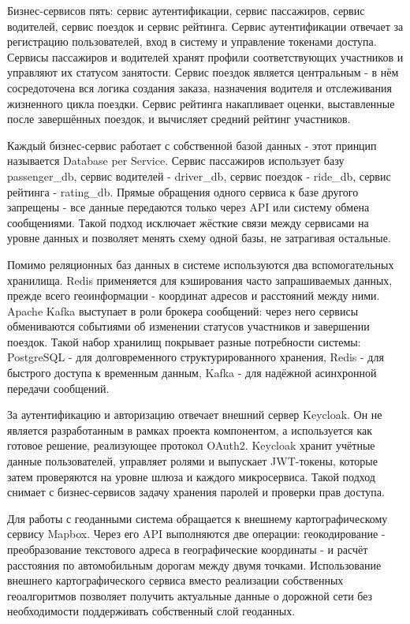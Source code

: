 {	\par \redline Бизнес-сервисов пять: сервис аутентификации, сервис пассажиров, сервис водителей, сервис поездок и сервис рейтинга. Сервис аутентификации отвечает за регистрацию пользователей, вход в систему и управление токенами доступа. Сервисы пассажиров и водителей хранят профили соответствующих участников и управляют их статусом занятости. Сервис поездок является центральным - в нём сосредоточена вся логика создания заказа, назначения водителя и отслеживания жизненного цикла поездки. Сервис рейтинга накапливает оценки, выставленные после завершённых поездок, и вычисляет средний рейтинг участников.
	
	\par \redline Каждый бизнес-сервис работает с собственной базой данных - этот принцип называется Database per Service. Сервис пассажиров использует базу passenger\_db, сервис водителей - driver\_db, сервис поездок - ride\_db, сервис рейтинга - rating\_db. Прямые обращения одного сервиса к базе другого запрещены - все данные передаются только через API или систему обмена сообщениями. Такой подход исключает жёсткие связи между сервисами на уровне данных и позволяет менять схему одной базы, не затрагивая остальные.
	
	\par \redline Помимо реляционных баз данных в системе используются два вспомогательных хранилища. Redis применяется для кэширования часто запрашиваемых данных, прежде всего геоинформации - координат адресов и расстояний между ними. Apache Kafka выступает в роли брокера сообщений: через него сервисы обмениваются событиями об изменении статусов участников и завершении поездок. Такой набор хранилищ покрывает разные потребности системы: PostgreSQL - для долговременного структурированного хранения, Redis - для быстрого доступа к временным данным, Kafka - для надёжной асинхронной передачи сообщений.
	
	\par \redline За аутентификацию и авторизацию отвечает внешний сервер Keycloak. Он не является разработанным в рамках проекта компонентом, а используется как готовое решение, реализующее протокол OAuth2. Keycloak хранит учётные данные пользователей, управляет ролями и выпускает JWT-токены, которые затем проверяются на уровне шлюза и каждого микросервиса. Такой подход снимает с бизнес-сервисов задачу хранения паролей и проверки прав доступа.
	
	\par \redline Для работы с геоданными система обращается к внешнему картографическому сервису Mapbox. Через его API выполняются две операции: геокодирование - преобразование текстового адреса в географические координаты - и расчёт расстояния по автомобильным дорогам между двумя точками. Использование внешнего картографического сервиса вместо реализации собственных геоалгоритмов позволяет получить актуальные данные о дорожной сети без необходимости поддерживать собственный слой геоданных.
	
}

